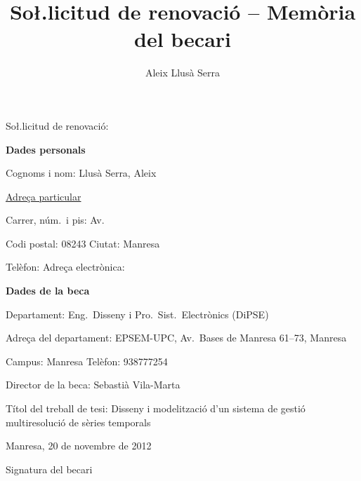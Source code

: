 \documentclass[paper=a4,parskip=half,
fontsize=11pt, %
]{scrartcl}
\title{So\l.licitud de renovació -- Memòria del becari}
\author{Aleix Llusà Serra}
\begin{document}
\mbox{}\vspace{1cm}

So\l.licitud de renovació:

\vfill

\textbf{Dades personals}

Cognoms i nom: Llusà Serra, Aleix

\underline{Adreça particular}

Carrer, núm.\ i pis: Av.\ 

Codi postal: 08243   Ciutat: Manresa

Telèfon:       Adreça electrònica: 


\vspace{2cm}


\textbf{Dades de la beca}

Departament: Eng.\ Disseny i Pro.\ Sist.\ Electrònics (DiPSE)

Adreça del departament: EPSEM-UPC, Av.\ Bases de Manresa 61--73, Manresa

Campus: Manresa  Telèfon: 938777254

Director de la beca: Sebastià Vila-Marta

Títol del treball de tesi: Disseny i modelització d'un sistema de gestió multiresolució de sèries temporals


\vfill

Manresa, 20 de novembre de 2012

\vspace{2cm}
\todo{}

Signatura del becari




\newpage









\printbibliography
\end{document}

